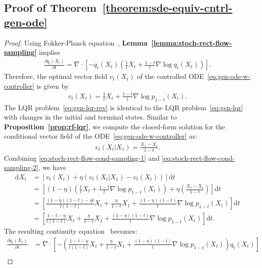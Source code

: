 \documentclass{article} %
\theoremstyle{plain}
\newcommand{\deriv}{\mathrm{d}}
\begin{document}
\subsection{Proof of Theorem~\ref{theorem:sde-equiv-cntrl-gen-ode}}
\label{sec:thm}
\begin{proof}
Using Fokker-Planck equation~\citep{oksendal2003stochastic}, \textbf{Lemma~\ref{lemma:stoch-rect-flow-sampling}} implies
\begin{align*}
    \frac{\partial q_t(X_t)}{\partial t} 
    = \nabla \cdot \left[-q_t(X_t) \left(\frac{1}{t}X_t + \frac{1-t}{t} \nabla \log q_{t}(X_t) \right)\right].
\end{align*}
Therefore, the optimal vector field $v_t(X_t)$ of the controlled ODE~\eqref{eq:gen-ode-w-controller} is given by
\begin{align}
\label{eq:stoch-rect-flow-cond-sampling-1}
    v_t(X_t) = \frac{1}{t}X_t + \frac{1-t}{t} \nabla \log p_{1-t}(X_t).
\end{align}
The LQR problem~\eqref{eq:gen-lqr-rev} is identical to the LQR problem~\eqref{eq:gen-lqr} with changes in the initial and terminal states.
Similar to \textbf{Proposition~\ref{prop:rf-lqr}}, we compute the closed-form solution for the conditional vector field of the ODE~\eqref{eq:gen-ode-w-controller} as:
\begin{align}
\label{eq:stoch-rect-flow-cond-sampling-2}
    v_t(X_t|X_1) = \frac{X_1 - X_t}{1-t}.
\end{align}
Combining \eqref{eq:stoch-rect-flow-cond-sampling-1} and \eqref{eq:stoch-rect-flow-cond-sampling-2}, we have 
\begin{align*}
    \deriv X_t 
    & = \left[v_t(X_t) + \eta (v_t(X_t|X_1) - v_t(X_t))\right]\deriv t\\
    & = \left[(1-\eta)\left(\frac{1}{t}X_t + \frac{1-t}{t} \nabla \log p_{1-t}(X_t)\right) + \eta \left(\frac{X_1 - X_t}{1-t}\right) \right]\deriv t\\
    & = \left[\frac{(1-\eta)(1-t) - \eta t }{t(1-t)}X_t +\frac{\eta}{1-t}X_1 + \frac{(1-\eta)(1-t)}{t}\nabla \log p_{1-t}(X_t)\right] \deriv t\\
    & = \left[\frac{1-t-\eta}{t(1-t)}X_t +\frac{\eta}{1-t}X_1 + \frac{(1-\eta)(1-t)}{t}\nabla \log p_{1-t}(X_t)\right] \deriv t.
\end{align*}
The resulting continuity equation~\citep{oksendal2003stochastic} becomes:
\begin{align*}
    \frac{\partial q_t(X_t)}{\partial t} 
    & = \nabla \cdot \left[-\left( \frac{1-t-\eta}{t(1-t)}X_t +\frac{\eta}{1-t}X_1 + \frac{(1-\eta)(1-t)}{t}\nabla \log p_{1-t}(X_t)\right)q_t(X_t) \right]\\

\end{align*}
\end{proof}
\end{document}
